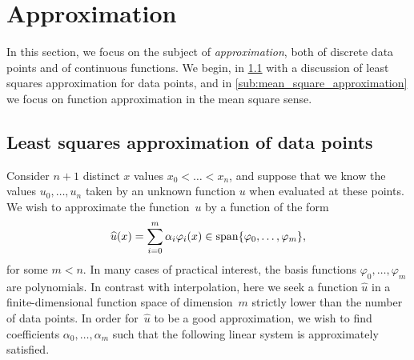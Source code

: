 \section{Approximation}
In this section,
we focus on the subject of \emph{approximation},
both of discrete data points and of continuous functions.
We begin, in \cref{sub:polynomial_regression} with a discussion of least squares approximation for data points,
and in \cref{sub:mean_square_approximation} we focus on function approximation in the mean square sense.

\subsection{Least squares approximation of data points}
\label{sub:polynomial_regression}
Consider $n + 1$ distinct $x$ values $x_0 < \dotsc < x_n$,
and suppose that we know the values $u_0, \dotsc, u_n$ taken by an unknown function $u$ when evaluated at these points.
We wish to approximate the function~$u$ by a function of the form
\begin{equation}
    \label{eq:expansion_approx}
    \widehat u(x) = \sum_{i=0}^{m} \alpha_i \varphi_i(x) \in \operatorname{span} \{ \varphi_0, \dotsc, \varphi_m \},
\end{equation}
for some $m < n$.
In many cases of practical interest,
the basis functions $\varphi_0, \dotsc, \varphi_m$ are polynomials.
In contrast with interpolation,
here we seek a function $\widehat u$ in a finite-dimensional function space of dimension~$m$ strictly lower than the number of data points.
In order for~$\widehat u$ to be a good approximation,
we wish to find coefficients $\alpha_0, \dotsc, \alpha_m$ such that
the following linear system is approximately satisfied.
